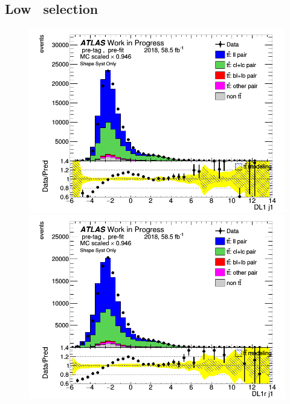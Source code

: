 \documentclass[letterpaper,12pt]{article}
\begin{document}
\subsection{Low \pt\ selection}
\begin{figure}[H]
\begin{minipage}[b]{.45\textwidth}
\centering
\includegraphics[width=1\textwidth]{Distribution_March/DataMC_J1_DL1.png}
\end{minipage}\hfill
\begin{minipage}[b]{.45\textwidth}
\centering
\includegraphics[width=1\textwidth]{Distribution_March/DataMC_J1_DL1r.png}
\end{minipage}\hfill
\begin{minipage}[b]{.45\textwidth}
\centering

\end{minipage}
\end{figure}
\end{document}
